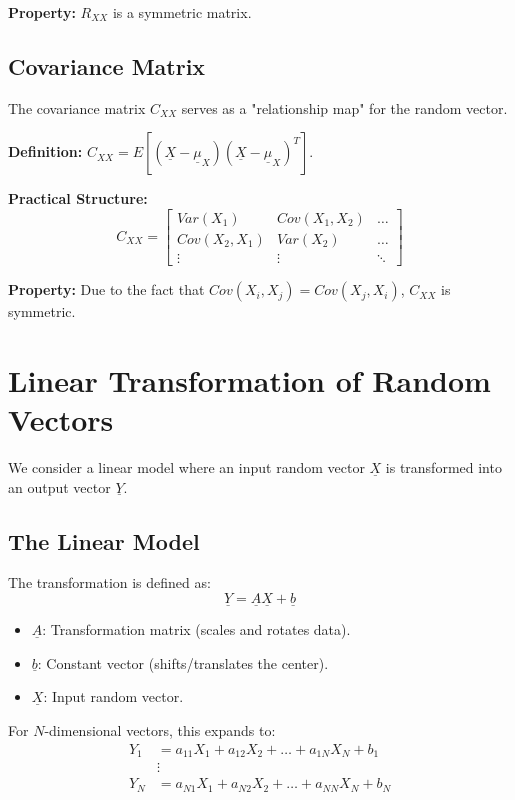 \documentclass[12pt]{article}
\begin{document}
\textbf{Property:} $R_{XX}$ is a symmetric matrix.

\subsection{Covariance Matrix}
The covariance matrix $C_{XX}$ serves as a "relationship map" for the random vector.

\textbf{Definition:} $C_{XX} = E[(\underline{X} - \underline{\mu}_X)(\underline{X} - \underline{\mu}_X)^T]$.

\textbf{Practical Structure:}
\[
C_{XX} = \begin{bmatrix} 
Var(X_1) & Cov(X_1, X_2) & \dots \\ 
Cov(X_2, X_1) & Var(X_2) & \dots \\ 
\vdots & \vdots & \ddots 
\end{bmatrix} \text{}
\]

\textbf{Property:} Due to the fact that $Cov(X_i, X_j) = Cov(X_j, X_i)$, $C_{XX}$ is symmetric.

\section{Linear Transformation of Random Vectors}
We consider a linear model where an input random vector $\underline{X}$ is transformed into an output vector $\underline{Y}$.

\subsection{The Linear Model}
The transformation is defined as:
\[
\underline{Y} = \underline{A}\underline{X} + \underline{b} \text{}
\]

\begin{itemize}
    \item $\underline{A}$: Transformation matrix (scales and rotates data).
    \item $\underline{b}$: Constant vector (shifts/translates the center).
    \item $\underline{X}$: Input random vector.
\end{itemize}

For $N$-dimensional vectors, this expands to:
\begin{align*}
    Y_1 &= a_{11}X_1 + a_{12}X_2 + \dots + a_{1N}X_N + b_1 \\
    &\vdots \\
    Y_N &= a_{N1}X_1 + a_{N2}X_2 + \dots + a_{NN}X_N + b_N
\end{align*}
\end{document}

